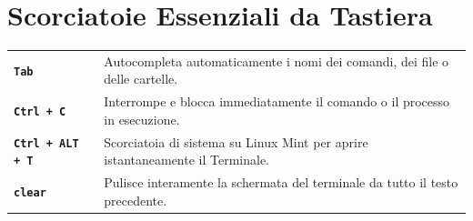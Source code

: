 \documentclass[10pt,a4paper]{article}
\begin{document}
\section*{Scorciatoie Essenziali da Tastiera}
\noindent
\begin{tabular}{@{}p{5cm}p{12cm}@{}}
\textbf{\texttt{Tab}} & Autocompleta automaticamente i nomi dei comandi, dei file o delle cartelle. \\
\textbf{\texttt{Ctrl + C}} & Interrompe e blocca immediatamente il comando o il processo in esecuzione. \\
\textbf{\texttt{Ctrl + ALT + T}} & Scorciatoia di sistema su Linux Mint per aprire istantaneamente il Terminale. \\
\textbf{\texttt{clear}} & Pulisce interamente la schermata del terminale da tutto il testo precedente.
\end{tabular}
\end{document}
